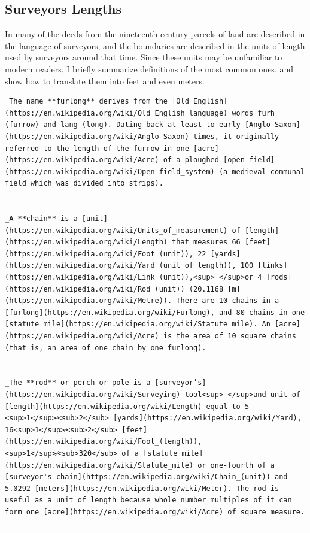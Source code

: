 \documentclass[
  12pt,
]{book}
\begin{document}
\hypertarget{surveyors-lengths}{%
\subsection{Surveyors Lengths}\label{surveyors-lengths}}

In many of the deeds from the nineteenth century parcels of land are described in the language of surveyors, and the boundaries are described in the units of length used by surveyors around that time. Since these units may be unfamiliar to modern readers, I briefly summarize definitions of the most common ones, and show how to translate them into feet and even meters.

\begin{verbatim}
_The name **furlong** derives from the [Old English](https://en.wikipedia.org/wiki/Old_English_language) words furh (furrow) and lang (long). Dating back at least to early [Anglo-Saxon](https://en.wikipedia.org/wiki/Anglo-Saxon) times, it originally referred to the length of the furrow in one [acre](https://en.wikipedia.org/wiki/Acre) of a ploughed [open field](https://en.wikipedia.org/wiki/Open-field_system) (a medieval communal field which was divided into strips). _


_A **chain** is a [unit](https://en.wikipedia.org/wiki/Units_of_measurement) of [length](https://en.wikipedia.org/wiki/Length) that measures 66 [feet](https://en.wikipedia.org/wiki/Foot_(unit)), 22 [yards](https://en.wikipedia.org/wiki/Yard_(unit_of_length)), 100 [links](https://en.wikipedia.org/wiki/Link_(unit)),<sup> </sup>or 4 [rods](https://en.wikipedia.org/wiki/Rod_(unit)) (20.1168 [m](https://en.wikipedia.org/wiki/Metre)). There are 10 chains in a [furlong](https://en.wikipedia.org/wiki/Furlong), and 80 chains in one [statute mile](https://en.wikipedia.org/wiki/Statute_mile). An [acre](https://en.wikipedia.org/wiki/Acre) is the area of 10 square chains (that is, an area of one chain by one furlong). _


_The **rod** or perch or pole is a [surveyor’s](https://en.wikipedia.org/wiki/Surveying) tool<sup> </sup>and unit of [length](https://en.wikipedia.org/wiki/Length) equal to ​5 <sup>1</sup>⁄<sub>2</sub> [yards](https://en.wikipedia.org/wiki/Yard), 16​<sup>1</sup>⁄<sub>2</sub> [feet](https://en.wikipedia.org/wiki/Foot_(length)), ​<sup>1</sup>⁄<sub>320</sub> of a [statute mile](https://en.wikipedia.org/wiki/Statute_mile) or one-fourth of a [surveyor's chain](https://en.wikipedia.org/wiki/Chain_(unit)) and 5.0292 [meters](https://en.wikipedia.org/wiki/Meter). The rod is useful as a unit of length because whole number multiples of it can form one [acre](https://en.wikipedia.org/wiki/Acre) of square measure. _



\end{verbatim}
\end{document}
